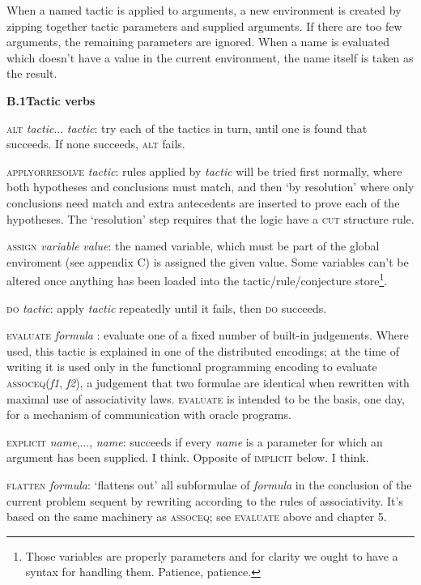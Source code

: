 \documentclass[11pt]{book}
\newcommand{\tab}{\hspace{5mm}}
\begin{document}
When a named tactic is applied to arguments, a new environment is created by zipping together tactic parameters and supplied arguments. If there are too few arguments, the remaining parameters are ignored. When a name is evaluated which doesn't have a value in the current environment, the name itself is taken as the result.


\textbf{{\large B.1\tab Tactic verbs}}


\textsc{alt} \textit{tactic}... \textit{tactic}: try each of the tactics in turn, until one is found that succeeds. If none succeeds, \textsc{alt} fails.


\textsc{applyorresolve} \textit{tactic}: rules applied by \textit{tactic} will be tried first normally, where both hypotheses and conclusions must match, and then `by resolution' where only conclusions need match and extra antecedents are inserted to prove each of the hypotheses. The `resolution' step requires that the logic have a \textsc{cut} structure rule.


\textsc{assign} \textit{variable} \textit{value}: the named variable, which must be part of the global enviroment (see appendix C) is assigned the given value. Some variables can't be altered once anything has been loaded into the tactic/rule/conjecture store\footnote{Those variables are properly parameters and for clarity we ought to have a syntax for handling them. Patience, patience.}.


\textsc{do} \textit{tactic}: apply \textit{tactic} repeatedly until it fails, then \textsc{do} succeeds.


\textsc{evaluate} \textit{formula} : evaluate one of a fixed number of built-in judgements. Where used, this tactic is explained in one of the distributed encodings; at the time of writing it is used only in the functional programming encoding to evaluate \textsc{assoceq}(\textit{f1}, \textit{f2}), a judgement that two formulae are identical when rewritten with maximal use of associativity laws. \textsc{evaluate} is intended to be the basis, one day, for a mechanism of communication with oracle programs.


\textsc{explicit} \textit{name},..., \textit{name}: succeeds if every \textit{name} is a parameter for which an argument has been supplied. I think. Opposite of \textsc{implicit} below. I think.


\textsc{flatten} \textit{formula}: `flattens out' all subformulae of \textit{formula} in the conclusion of the current problem sequent by rewriting according to the rules of associativity. It's based on the same machinery as \textsc{assoceq}; see \textsc{evaluate} above and chapter 5.
\end{document}
